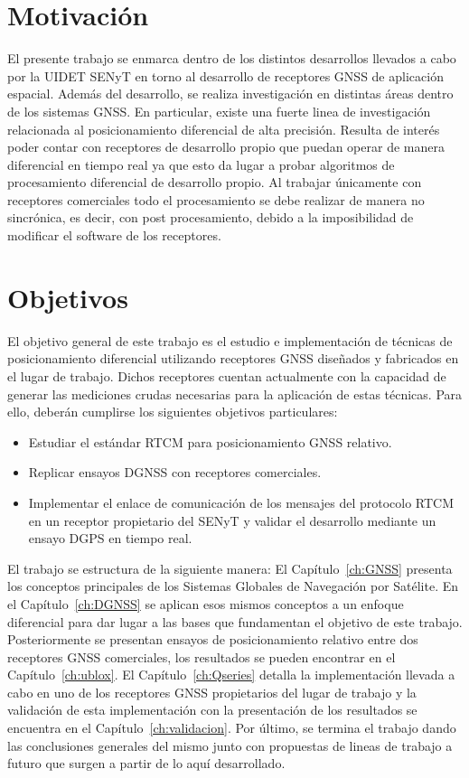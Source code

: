 \documentclass[a4paper,12pt,oneside,onecolumn,final,openright]{book}%
\begin{document}
\section*{Motivación}
	El presente trabajo se enmarca dentro de los distintos desarrollos llevados a cabo por la UIDET SENyT en torno al desarrollo de receptores GNSS de aplicación espacial. Además del desarrollo, se realiza investigación en distintas áreas dentro de los sistemas GNSS. En particular, existe una fuerte linea de investigación relacionada al posicionamiento diferencial de alta precisión. Resulta de interés poder contar con receptores de desarrollo propio que puedan operar de manera diferencial en tiempo real ya que esto da lugar a probar algoritmos de procesamiento diferencial de desarrollo propio. Al trabajar únicamente con receptores comerciales todo el procesamiento se debe realizar de manera no sincrónica, es decir, con post procesamiento, debido a la imposibilidad de modificar el software de los receptores.
\section*{Objetivos}
	El objetivo general de este trabajo es el estudio e implementación de técnicas de posicionamiento diferencial utilizando receptores GNSS diseñados y fabricados en el lugar de trabajo. Dichos receptores cuentan actualmente con la capacidad de generar las mediciones crudas necesarias para la aplicación de estas técnicas. Para ello, deberán cumplirse los siguientes objetivos particulares:
\begin{itemize}
	\item Estudiar el estándar RTCM para posicionamiento GNSS relativo.
	\item Replicar ensayos DGNSS con receptores comerciales.
	\item Implementar el enlace de comunicación de los mensajes del protocolo RTCM en un receptor propietario del SENyT y validar el desarrollo mediante un ensayo DGPS en tiempo real.
\end{itemize}	

	El trabajo se estructura de la siguiente manera: El Capítulo~\ref{ch:GNSS} presenta los conceptos principales de los Sistemas Globales de Navegación por Satélite. En el Capítulo~\ref{ch:DGNSS} se aplican esos mismos conceptos a un enfoque diferencial para dar lugar a las bases que fundamentan el objetivo de este trabajo. Posteriormente se presentan ensayos de posicionamiento relativo entre dos receptores GNSS comerciales, los resultados se pueden encontrar en el Capítulo~\ref{ch:ublox}. El Capítulo~\ref{ch:Qseries} detalla la implementación llevada a cabo en uno de los receptores GNSS propietarios del lugar de trabajo y la validación de esta implementación con la presentación de los resultados se encuentra en el Capítulo~\ref{ch:validacion}. Por último, se termina el trabajo dando las conclusiones generales del mismo junto con propuestas de lineas de trabajo a futuro que surgen a partir de lo aquí desarrollado.
\end{document}
